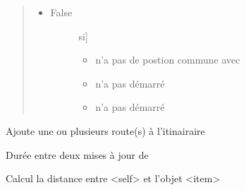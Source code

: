 \documentclass[a4paper,10pt,french]{sphinxmanual}
\begin{document}
\begin{fulllineitems}
\begin{fulllineitems}
\begin{quote}
\begin{description}
\begin{itemize}
\item {} \begin{description}
\item[{False}] \leavevmode{[}si{]}\begin{itemize}
\item {} 
 n’a pas de postion commune avec 

\item {} 
 n’a pas démarré

\item {} 
 n’a pas démarré

\end{itemize}

\end{description}

\end{itemize}


\end{description}\end{quote}

\end{fulllineitems}


\begin{fulllineitems}
\label{\detokenize{road_objects/road_item:road_objects.road_item.RoadItem.add_road}}
Ajoute une ou plusieurs route(s) à l’itinairaire

\end{fulllineitems}


\begin{fulllineitems}
\label{\detokenize{road_objects/road_item:road_objects.road_item.RoadItem.delta_time}}
Durée entre deux mises à jour de 

\end{fulllineitems}


\begin{fulllineitems}
\label{\detokenize{road_objects/road_item:road_objects.road_item.RoadItem.distance}}
Calcul la distance entre \textless{}self\textgreater{} et l’objet \textless{}item\textgreater{}


\end{fulllineitems}
\end{fulllineitems}
\end{document}
